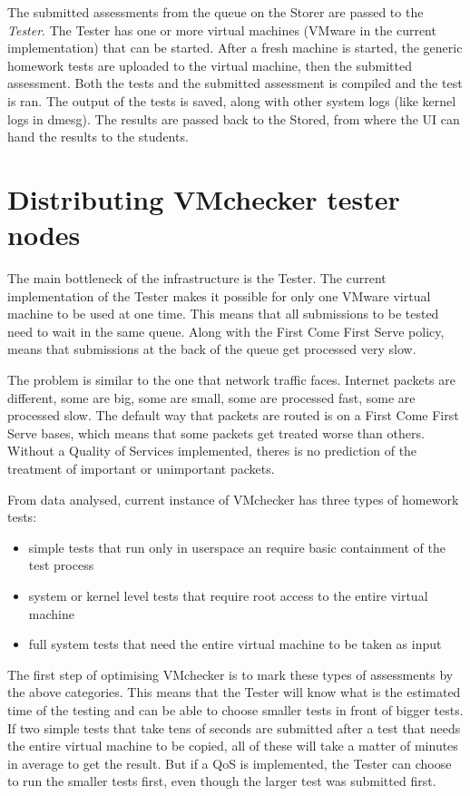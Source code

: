 The submitted assessments from the queue on the Storer are passed to the
\emph{Tester}. The Tester has one or more virtual machines (VMware in the
current implementation) that can be started. After a fresh machine is
started, the generic homework tests are uploaded to the virtual machine,
then the submitted assessment. Both the tests and the submitted assessment
is compiled and the test is ran. The output of the tests is saved, along
with other system logs (like kernel logs in dmesg). The results are passed
back to the Stored, from where the UI can hand the results to the students.

\section{Distributing VMchecker tester nodes}

The main bottleneck of the infrastructure is the Tester. The current
implementation of the Tester makes it possible for only one  VMware virtual
machine to be used at one time. This means that all submissions to be
tested need to wait in the same queue. Along with the First Come First
Serve policy, means that submissions at the back of the queue get processed
very slow.

The problem is similar to the one that network traffic faces. Internet
packets are different, some are big, some are small, some are processed
fast, some are processed slow. The default way that packets are routed is
on a First Come First Serve bases, which means that some packets get
treated worse than others. Without a Quality of Services implemented,
theres is no prediction of the treatment of important or unimportant
packets.

From data analysed, current instance of VMchecker has three types of
homework tests:
\begin{itemize}
\item simple tests that run only in userspace an require basic containment
of the test process
\item system or kernel level tests that require root access to the entire
virtual machine
\item full system tests that need the entire virtual machine to be taken as
input
\end{itemize}

The first step of optimising VMchecker is to mark these types of
assessments by the above categories. This means that the Tester will know
what is the estimated time of the testing and can be able to choose smaller
tests in front of bigger tests. If two simple tests that take tens of
seconds are submitted after a test that needs the entire virtual machine to
be copied, all of these will take a matter of minutes in average to get the
result. But if a QoS is implemented, the Tester can choose to run the
smaller tests first, even though the larger test was submitted first.

